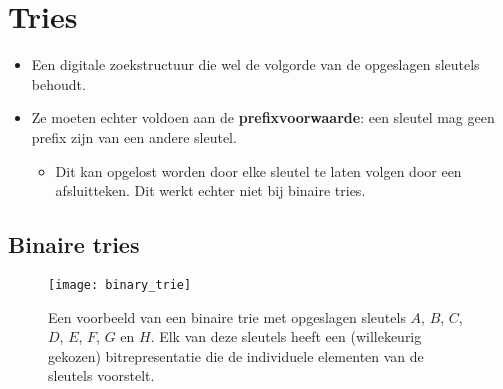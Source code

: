 \section{Tries}
\begin{itemize}
    \item Een digitale zoekstructuur die wel de volgorde van de opgeslagen sleutels behoudt.
    \item Ze moeten echter voldoen aan de \textbf{prefixvoorwaarde}: een sleutel mag geen prefix zijn van een andere sleutel. 
    \begin{itemize}
        \item Dit kan opgelost worden door elke sleutel te laten volgen door een afsluitteken. Dit werkt echter niet bij binaire tries.
    \end{itemize}
\end{itemize}

\subsection{Binaire tries}

\begin{figure}[ht]
    \centering
    \texttt{[image: binary\_trie]}
    \caption{Een voorbeeld van een binaire trie met opgeslagen sleutels $A$, $B$, $C$, $D$, $E$, $F$, $G$ en $H$. Elk van deze sleutels heeft een (willekeurig gekozen) bitrepresentatie die de individuele elementen van de sleutels voorstelt.}
    \label{fig:binary_trie}
\end{figure}

